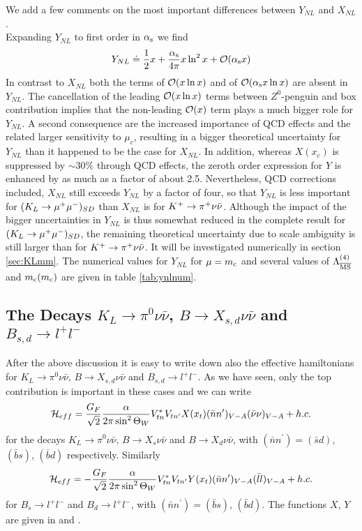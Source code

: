 We add a few comments on the most important differences between
$Y_{NL}$ and $X_{NL}$.\\
Expanding $Y_{NL}$ to first order in $\alpha_{\rm s}$ we find
\begin{equation}\label{ylin}
Y_{NL}\doteq {1\over 2}x +{\alpha_{\rm s}\over 4\pi} x \ln^2x +{\cal O}(\alpha_{\rm s} x)  \end{equation}
In contrast to $X_{NL}$ both the terms of ${\cal O}(x\ln x)$ and of
${\cal O}(\alpha_{\rm s} x\ln x)$ are absent in $Y_{NL}$. The cancellation
of the leading ${\cal O}(x\ln x)$ terms between $Z^0$-penguin and box
contribution implies that the non-leading ${\cal O}(x)$ term plays a
much bigger role for $Y_{NL}$. A second consequence are the increased
importance of QCD effects and the related larger sensitivity to $\mu_c$,
resulting in a bigger theoretical uncertainty for $Y_{NL}$ than it
happened to be the case for $X_{NL}$. In addition, whereas $X(x_c)$
is suppressed by $\sim 30\%$ through QCD effects, the zeroth order
expression for $Y$ is enhanced by as much as a factor of about 2.5.
Nevertheless, QCD corrections included, $X_{NL}$ still exceeds $Y_{NL}$
by a factor of four, so that $Y_{NL}$ is less important for
$(K_L \to \mu^+\mu^-)_{SD}$ than $X_{NL}$ is for $K^+ \to \pi^+\nu\bar\nu$. Although the impact of the
bigger uncertainties in $Y_{NL}$ is thus somewhat reduced in the
complete result for $(K_L \to \mu^+\mu^-)_{SD}$, the remaining theoretical uncertainty
due to scale ambiguity is still larger than for $K^+ \to \pi^+\nu\bar\nu$. It will be
investigated numerically in section \ref{sec:KLmm}. The numerical
values for $Y_{NL}$ for $\mu=m_{\rm c}$ and several values of $\Lambda_{\overline{\rm MS}}^{(4)}$
and $m_{\rm c}(m_{\rm c})$ are given in table \ref{tab:ynlnum}.

\subsection{The Decays $K_L\to\pi^0\nu\bar\nu$, $B\to X_{s,d}\nu\bar\nu$ and
            $B_{s,d}\to l^+l^-$}
            \label{sec:HeffRareKB:klpinn}
After the above discussion it is easy to write down also the effective
hamiltonians for $K_L\to\pi^0\nu\bar\nu$, $B\to X_{s,d}\nu\bar\nu$
and $B_{s,d}\to l^+l^-$. As we have seen, only the top contribution is
important in these cases and we can write
\begin{equation}\label{hxnu}
{\cal H}_{eff} = {G_F\over \sqrt 2} {\alpha \over
2\pi \sin^2 \Theta_W} V^\ast_{tn} V_{tn^\prime}
X (x_t) (\bar nn^\prime)_{V-A} (\bar\nu\nu)_{V-A} + h.c.   \end{equation}
for the decays $K_L\to\pi^0\nu\bar\nu$, $B\to X_s\nu\bar\nu$
and $B\to X_d\nu\bar\nu$, with $(\bar nn^\prime)=(\bar sd)$, $(\bar bs)$,
$(\bar bd)$ respectively. Similarly
\begin{equation}\label{hyll}
{\cal H}_{eff} = -{G_F\over \sqrt 2} {\alpha \over
2\pi \sin^2 \Theta_W} V^\ast_{tn} V_{tn^\prime}
Y (x_t) (\bar nn^\prime)_{V-A} (\bar ll)_{V-A} + h.c.   \end{equation}
for $B_s\to l^+l^-$ and $B_d\to l^+l^-$, with
$(\bar nn^\prime)=(\bar bs)$, $(\bar bd)$.
The functions $X$, $Y$ are given in  and .


